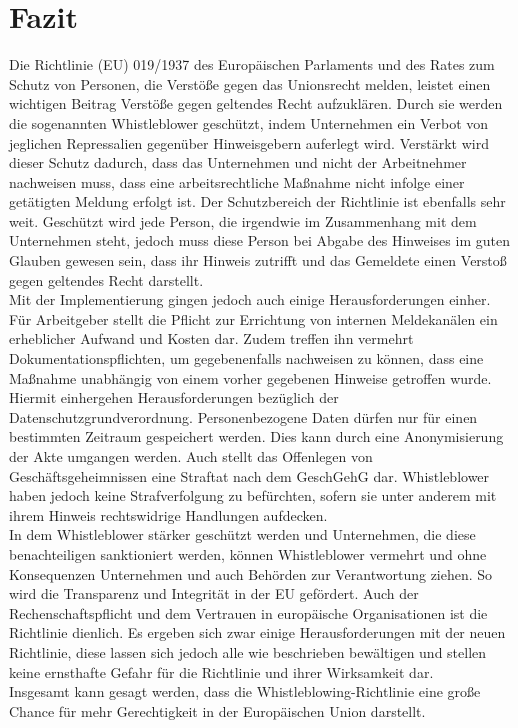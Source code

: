 \section{Fazit}
\label{sec:Fazit}
Die Richtlinie (EU) 019/1937 des Europäischen Parlaments und des Rates zum Schutz von Personen, die Verstöße gegen das Unionsrecht melden, leistet einen wichtigen Beitrag Verstöße gegen geltendes Recht aufzuklären.
Durch sie werden die sogenannten Whistleblower geschützt, indem Unternehmen ein Verbot von jeglichen Repressalien gegenüber Hinweisgebern auferlegt wird.
Verstärkt wird dieser Schutz dadurch, dass das Unternehmen und nicht der Arbeitnehmer nachweisen muss, dass eine arbeitsrechtliche Maßnahme nicht infolge einer getätigten Meldung erfolgt ist.
Der Schutzbereich der Richtlinie ist ebenfalls sehr weit.
Geschützt wird jede Person, die irgendwie im Zusammenhang mit dem Unternehmen steht, jedoch muss diese Person bei Abgabe des Hinweises im guten Glauben gewesen sein, dass ihr Hinweis zutrifft und das Gemeldete einen Verstoß gegen geltendes Recht darstellt.\\
Mit der Implementierung gingen jedoch auch einige Herausforderungen einher.
Für Arbeitgeber stellt die Pflicht zur Errichtung von internen Meldekanälen ein erheblicher Aufwand und Kosten dar.
Zudem treffen ihn vermehrt Dokumentationspflichten, um gegebenenfalls nachweisen zu können, dass eine Maßnahme unabhängig von einem vorher gegebenen Hinweise getroffen wurde.
Hiermit einhergehen Herausforderungen bezüglich der Datenschutzgrundverordnung.
Personenbezogene Daten dürfen nur für einen bestimmten Zeitraum gespeichert werden.
Dies kann durch eine Anonymisierung der Akte umgangen werden.
Auch stellt das Offenlegen von Geschäftsgeheimnissen eine Straftat nach dem GeschGehG dar.
Whistleblower haben jedoch keine Strafverfolgung zu befürchten, sofern sie unter anderem mit ihrem Hinweis rechtswidrige Handlungen aufdecken.\\
In dem Whistleblower stärker geschützt werden und Unternehmen, die diese benachteiligen sanktioniert werden, können Whistleblower vermehrt und ohne Konsequenzen Unternehmen und auch Behörden zur Verantwortung ziehen.
So wird die Transparenz und Integrität in der EU gefördert.
Auch der Rechenschaftspflicht und dem Vertrauen in europäische Organisationen ist die Richtlinie dienlich.
Es ergeben sich zwar einige Herausforderungen mit der neuen Richtlinie, diese lassen sich jedoch alle wie beschrieben bewältigen und stellen keine ernsthafte Gefahr für die Richtlinie und ihrer Wirksamkeit dar.\\
Insgesamt kann gesagt werden, dass die Whistleblowing-Richtlinie eine große Chance für mehr Gerechtigkeit in der Europäischen Union darstellt.